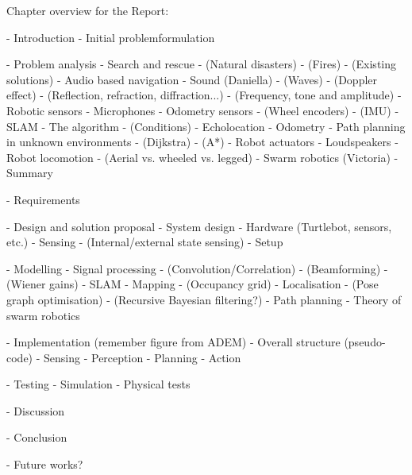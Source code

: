 Chapter overview for the Report:

- Introduction
    - Initial problemformulation

- Problem analysis
    - Search and rescue 
        - (Natural disasters)
        - (Fires)
        - (Existing solutions)
    - Audio based navigation
        - Sound (Daniella)
            - (Waves)
            - (Doppler effect)
            - (Reflection, refraction, diffraction...)
            - (Frequency, tone and amplitude)
        - Robotic sensors
            - Microphones
            - Odometry sensors
                - (Wheel encoders)
                - (IMU)
        - SLAM
            - The algorithm
                - (Conditions)
            - Echolocation 
            - Odometry
        - Path planning in unknown environments
            - (Dijkstra)
            - (A*)
        - Robot actuators
            - Loudspeakers
            - Robot locomotion
                - (Aerial vs. wheeled vs. legged)
    - Swarm robotics (Victoria)
    - Summary

- Requirements

- Design and solution proposal
    - System design
    - Hardware (Turtlebot, sensors, etc.)
        - Sensing
            - (Internal/external state sensing)
    - Setup

- Modelling
    - Signal processing
        - (Convolution/Correlation)
        - (Beamforming)
        - (Wiener gains)
    - SLAM
        - Mapping
            - (Occupancy grid)
        - Localisation
            - (Pose graph optimisation)
            - (Recursive Bayesian filtering?)
    - Path planning
    - Theory of swarm robotics

- Implementation (remember figure from ADEM)
    - Overall structure (pseudo-code)
    - Sensing
    - Perception
    - Planning
    - Action

- Testing
    - Simulation
    - Physical tests

- Discussion

- Conclusion

- Future works?





